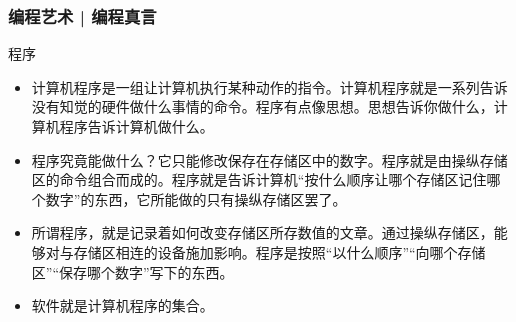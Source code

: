 \begin{frame}
  \frametitle{编程艺术 | 编程真言}
  \begin{block}{程序}
    \begin{itemize}
      \item 计算机程序是一组让计算机执行某种动作的指令。计算机程序就是一系列告诉没有知觉的硬件做什么事情的命令。程序有点像\alert{思想}。思想告诉你做什么，计算机程序告诉计算机做什么。
      \item 程序究竟能做什么？它只能修改保存在存储区中的数字。程序就是由操纵存储区的命令组合而成的。程序就是告诉计算机“按什么顺序让哪个存储区记住哪个数字”的东西，它所能做的只有\alert{操纵存储区}罢了。
      \item 所谓程序，就是记录着如何改变存储区所存数值的文章。通过操纵存储区，能够对与存储区相连的设备施加影响。程序是按照“以什么顺序”“向哪个存储区”“保存哪个数字”写下的东西。
      \item 软件就是计算机程序的集合。
    \end{itemize}
  \end{block}
\end{frame}

